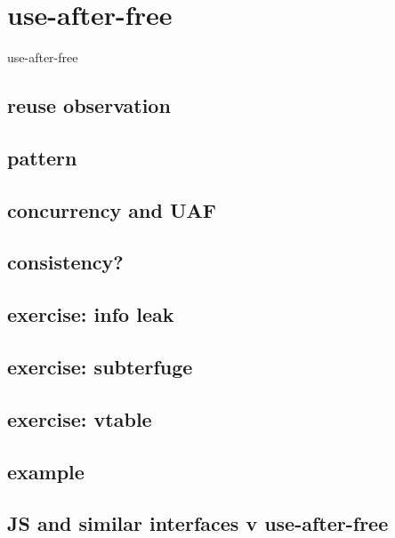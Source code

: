 \section{use-after-free}
\begin{frame}{use-after-free}
\end{frame}



\subsection{reuse observation}


\subsection{pattern}


\subsection{concurrency and UAF}


\subsection{consistency?}


\subsection{exercise: info leak}


\subsection{exercise: subterfuge}


\subsection{exercise: vtable}


\subsection{example}


\subsection{JS and similar interfaces v use-after-free}


